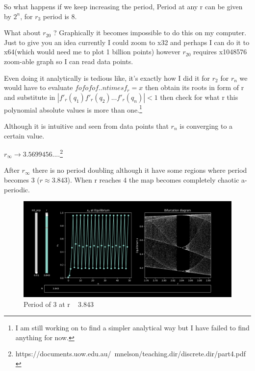 \documentclass{report}
\begin{document}
So what happens if we keep increasing the period, Period at any r can be given by $2^n$, for $r_3$ period is 8.

What about $r_{20}$ ? Graphically it becomes impossible to do this on my computer. Just to give you an idea currently I could zoom to x32 and perhaps I can do it to x64(which would need me to plot 1 billion points) however $r_{20}$ requires x1048576 zoom-able graph so I can read data points.
\newline

Even doing it analytically is tedious like, it's exactly how I did it for $r_2$ for $r_n$ we would have to evaluate $fofofof..ntimesf_r = x$ then obtain its roots in form of r and substitute in $|f'_r(q_1)f'_r(q_2)...f'_r(q_n)| < 1$ then check for what r this polynomial absolute values is more than one.\footnote[1]{I am still working on to find a simpler analytical way but I have failed to find anything for now.}
\newline

Although it is intuitive and seen from data points that $r_n$ is converging to a certain value. \newline

$r_\infty \to 3.5699456....$\footnote[2]{https://documents.uow.edu.au/~mnelson/teaching.dir/discrete.dir/part4.pdf}
\newline

After $r_\infty$ there is no period doubling although it have some regions where period becomes 3 ($r \approx 3.843$). When r reaches 4 the map becomes completely  chaotic a-periodic.
\newpage

\begin{figure}[!h]
    \centering
    \includegraphics[scale=.45]{images/period3ing.png}
    \caption{Period of 3 at r ~ 3.843}
    \label{fig:my_label6}
\end{figure}
\end{document}
